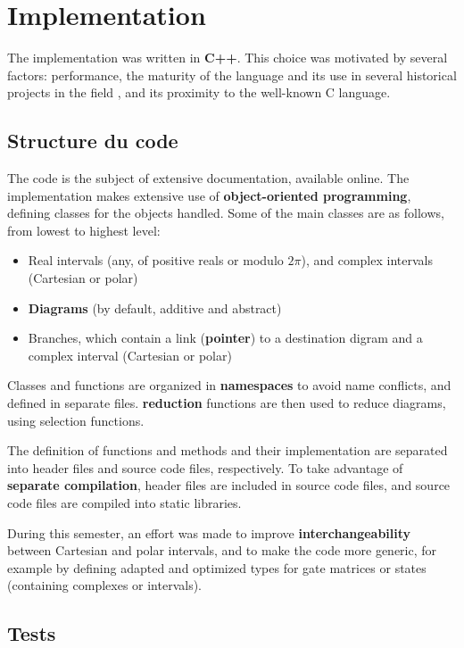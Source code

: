 \chapter{Implementation}
\label{ch:Implementation}

The implementation was written in \textbf{C++}. This choice was motivated by several factors: performance, the maturity of the language and its use in several historical projects in the field \cite{Bichsel_2023} \cite{QTranslator}, and its proximity to the well-known C language.

\section{Structure du code}

The code is the subject of extensive documentation, available online. \cite{Leroy_doc}
The implementation makes extensive use of \textbf{object-oriented programming}, defining classes for the objects handled.
Some of the main classes are as follows, from lowest to highest level:
\begin{itemize}
  \item Real intervals (any, of positive reals or modulo $2\pi$), and complex intervals (Cartesian or polar)
  \item \textbf{Diagrams} (by default, additive and abstract)
  \item Branches, which contain a link (\textbf{pointer}) to a destination digram and a complex interval (Cartesian or polar)
\end{itemize}

Classes and functions are organized in \textbf{namespaces} to avoid name conflicts, and defined in separate files. \textbf{reduction} functions are then used to reduce diagrams, using selection functions.

The definition of functions and methods and their implementation are separated into header files and source code files, respectively. To take advantage of \textbf{separate compilation}, header files are included in source code files, and source code files are compiled into static libraries.

During this semester, an effort was made to improve \textbf{interchangeability} between Cartesian and polar intervals, and to make the code more generic, for example by defining adapted and optimized types for gate matrices or states (containing complexes or intervals).

\section{Tests}

